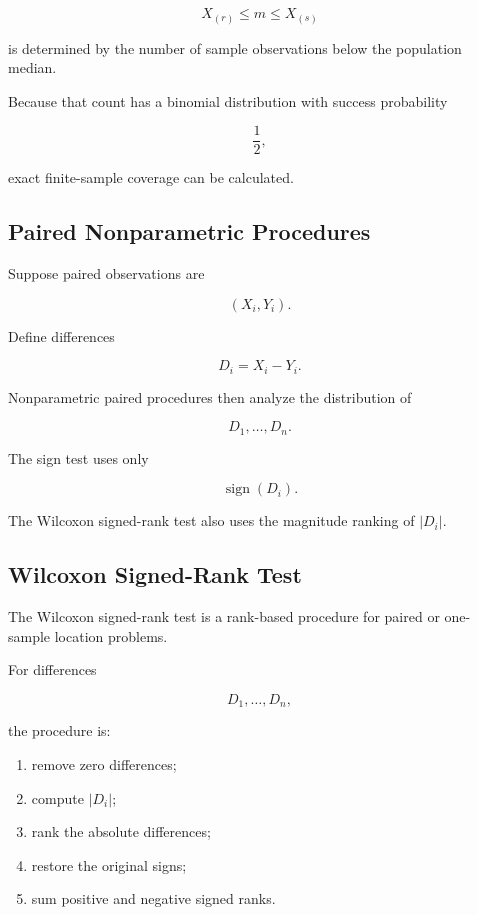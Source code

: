 \[
X_{(r)}
\leq
m
\leq
X_{(s)}
\]

is determined by the number of sample observations below the population
median.

Because that count has a binomial distribution with success probability

\[
\frac12,
\]

exact finite-sample coverage can be calculated.

\subsection{Paired Nonparametric Procedures}
\label{subsec:paired-nonparametric}

Suppose paired observations are

\[
(X_i,Y_i).
\]

Define differences

\[
\boxed{
D_i=X_i-Y_i.
}
\]

Nonparametric paired procedures then analyze the distribution of

\[
D_1,\ldots,D_n.
\]

The sign test uses only

\[
\operatorname{sign}(D_i).
\]

The Wilcoxon signed-rank test also uses the magnitude ranking of
\(|D_i|\).

\subsection{Wilcoxon Signed-Rank Test}
\label{subsec:wilcoxon-signed-rank}

The Wilcoxon signed-rank test is a rank-based procedure for paired or
one-sample location problems.

For differences

\[
D_1,\ldots,D_n,
\]

the procedure is:

\begin{enumerate}
    \item remove zero differences;
    \item compute \(|D_i|\);
    \item rank the absolute differences;
    \item restore the original signs;
    \item sum positive and negative signed ranks.
\end{enumerate}

